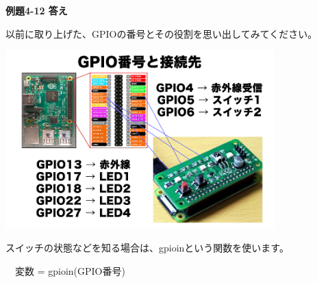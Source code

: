 \documentclass[a4paper,dvipdfmx]{jarticle}
\begin{document}
\bigskip


\bigskip


\bigskip


\bigskip


\bigskip


\bigskip

{\bfseries
例題4-12 答え}


\bigskip

以前に取り上げた、GPIOの番号とその役割を思い出してみてください。



\begin{center}
\includegraphics[width=10.372cm,height=6.89cm]{text04-img/text04-img004.png}

\end{center}

\bigskip


\bigskip


\bigskip


\bigskip


\bigskip


\bigskip


\bigskip


\bigskip


\bigskip


\bigskip


\bigskip


\bigskip


\bigskip


\bigskip


\bigskip


\bigskip

スイッチの状態などを知る場合は、gpioinという関数を使います。


\bigskip

\ \ 変数 = gpioin(GPIO番号)


\bigskip
\end{document}
